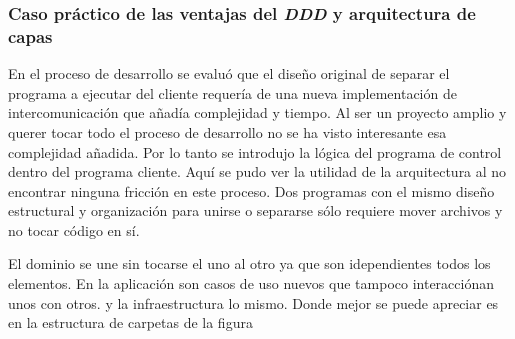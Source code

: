 \subsubsection{Caso práctico de las ventajas del \textit{DDD} y arquitectura de capas}

En el proceso de desarrollo se evaluó que el diseño original de separar el programa a ejecutar del cliente requería de una nueva implementación de intercomunicación que añadía complejidad y tiempo.
Al ser un proyecto amplio y querer tocar todo el proceso de desarrollo no se ha visto interesante esa complejidad añadida.
Por lo tanto se introdujo la lógica del programa de control dentro del programa cliente.
Aquí se pudo ver la utilidad de la arquitectura al no encontrar ninguna fricción en este proceso.
Dos programas con el mismo diseño estructural y organización para unirse o separarse sólo requiere mover archivos y no tocar código en sí.

El dominio se une sin tocarse el uno al otro ya que son idependientes todos los elementos.
En la aplicación son casos de uso nuevos que tampoco interacciónan unos con otros.
y la infraestructura lo mismo.
Donde mejor se puede apreciar es en la estructura de carpetas de la figura

